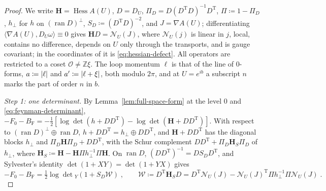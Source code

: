 \documentclass[11pt]{preprint}
\DeclarePairedDelimiter{\abs}{\lvert}{\rvert}
\numberwithin{equation}{section}
\theoremstyle{definition}
\theoremstyle{remark}
\theoremstyle{plain}
\begin{document}
\begin{proof}
We write $\mathbf H = \operatorname{Hess}A(U)$, $D = D_U$, $\Pi_D = D(D^{\mathrm T}D)^{-1}D^{\mathrm T}$, $\Pi \coloneqq 1 - \Pi_D$, $h_\perp$ for $h$ on $(\operatorname{ran}D)^\perp$, $S_D \coloneqq (D^{\mathrm T}D)^{-2}$, and $J = \nabla A(U)$; differentiating $\langle\nabla A(U), D_U\omega\rangle \equiv 0$ gives $\mathbf HD = \mathcal N_U(J)$, where $\mathcal N_U(j)$ is linear in $j$, local, contains no difference, depends on $U$ only through the transports, and is gauge covariant; in the coordinates of \cite{BalabanPBG} it is \eqref{eq:hessian-defect}. All operators are restricted to a coset $\mathcal O \neq \mathbb Z\xi$. The loop momentum $\ell$ is that of the line of $0$-forms, $a \coloneqq \abs{\ell}$ and $a' \coloneqq \abs{\ell + \xi}$, both modulo $2\pi$, and at $U = e^{ib}$ a subscript $n$ marks the part of order $n$ in $b$.

\emph{Step 1: one determinant.} By Lemma~\ref{lem:full-space-form} at the level $0$ and \eqref{eq:feynman-determinant}, $-F_0 - B_{\mathrm F} = -\frac12[\log\det(h + DD^{\mathrm T}) - \log\det(\mathbf H + DD^{\mathrm T})]$. With respect to $(\operatorname{ran}D)^\perp \oplus \operatorname{ran}D$, $h + DD^{\mathrm T} = h_\perp \oplus DD^{\mathrm T}$, and $\mathbf H + DD^{\mathrm T}$ has the diagonal blocks $h_\perp$ and $\Pi_D\mathbf H\Pi_D + DD^{\mathrm T}$, with the Schur complement $DD^{\mathrm T} + \Pi_D\mathbf H_S\Pi_D$ of $h_\perp$, where $\mathbf H_S \coloneqq \mathbf H - \mathbf H\Pi h_\perp^{-1}\Pi\mathbf H$. On $\operatorname{ran}D$, $(DD^{\mathrm T})^{-1} = DS_DD^{\mathrm T}$, and Sylvester's identity $\det(1 + XY) = \det(1 + YX)$ gives
\begin{equation}\label{eq:one-determinant}
    -F_0 - B_{\mathrm F} = \tfrac12\log\det{}_Y(1 + S_D\mathcal W)\;,
    \qquad
    \mathcal W \coloneqq D^{\mathrm T}\mathbf H_SD = D^{\mathrm T}\mathcal N_U(J) - \mathcal N_U(J)^{\mathrm T}\Pi h_\perp^{-1}\Pi\mathcal N_U(J)\;.
\end{equation}


\end{proof}
\end{document}

